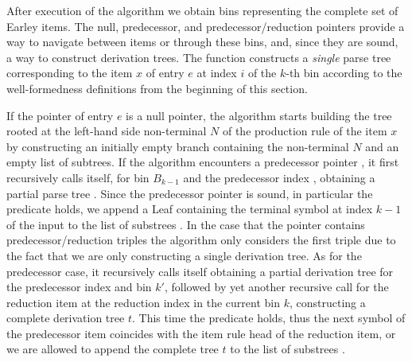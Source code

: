 \begin{isabellebody}
\isadelimproof
%
\endisadelimproof
%
\isatagproof
%
\endisatagproof
{\isafoldproof}%
%
\isadelimproof
%
\endisadelimproof
%
\isadelimdocument
%
\endisadelimdocument
%
\isatagdocument
%
\isamarkuptrue%
%
\endisatagdocument
{\isafolddocument}%
%
\isadelimdocument
%
\endisadelimdocument
%
\begin{isamarkuptext}%
After execution of the  algorithm we obtain bins representing the complete set
of Earley items. The null, predecessor, and predecessor/reduction pointers provide a way to navigate
between items or through these bins, and, since they are sound, a way to construct derivation trees.
The function  constructs a \textit{single} parse tree corresponding to the item $x$ of entry $e$ at index $i$ of the $k$-th bin according to the
well-formedness definitions from the beginning of this section.

If the pointer of entry $e$ is a null pointer, the algorithm starts building the tree rooted at
the left-hand side non-terminal $N$ of the production rule of the item $x$ by constructing an initially
empty branch containing the non-terminal $N$ and an empty list of subtrees. If the algorithm encounters
a predecessor pointer , it first recursively calls itself, for bin $B_{k-1}$ and the
predecessor index , obtaining a partial parse tree . Since the predecessor pointer is sound,
in particular the  predicate holds, we append a Leaf containing the terminal symbol at index
$k-1$ of the input \isa{{\isasymomega}} to the list of substrees . In the case that
the pointer contains predecessor/reduction triples the algorithm only considers the first triple
 due to the fact that we are only constructing a single derivation tree. As for the predecessor
case, it recursively calls itself obtaining a partial derivation tree  for the predecessor index 
and bin $k'$, followed by yet another recursive call for the reduction item at the reduction index 
in the current bin $k$, constructing a complete derivation tree $t$. This time the 
predicate holds, thus the next symbol of the predecessor item coincides with the item rule head of
the reduction item, or we are allowed to append the complete tree $t$ to the list of substrees .


\end{isamarkuptext}
\end{isabellebody}

